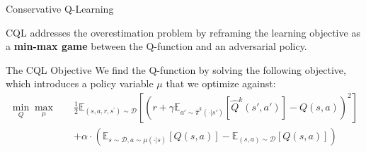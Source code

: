 \documentclass[11pt]{beamer}
\newcommand{\mc}[1]{\mathcal{#1}}
\newcommand{\tb}[1]{\textbf{#1}}
\begin{document}
\begin{frame}{Conservative Q-Learning}
    


    CQL addresses the overestimation problem by reframing the learning objective as a \textbf{min-max game} between the Q-function and an adversarial policy.

    \begin{block}{The CQL Objective}
        We find the Q-function by solving the following objective, which introduces a policy variable $\mu$ that we optimize against:
        \[
        \begin{aligned}
        \min_Q \max_{\mu} \quad &\frac{1}{2}\mathbb{E}_{(s,a,r,s^\prime) \sim \mc{D}} \left[ \left( r + \gamma \mathbb{E}_{a' \sim \hat{\pi}^k(\cdot|s')}[\hat{Q}^k(s', a')] - Q(s,a)\right)^2\right] \\
        &+ \alpha \cdot \left(\mathbb{E}_{s \sim \mathcal{D}, a \sim \mu(\cdot|s)}[Q(s,a)] - \mathbb{E}_{(s,a) \sim \mathcal{D}}[Q(s,a)]\right)
        \end{aligned}
        \]
        

\end{block}
\end{frame}
\end{document}
